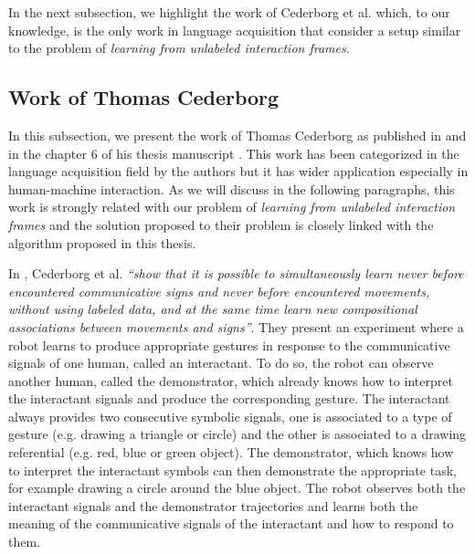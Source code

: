 In the next subsection, we highlight the work of Cederborg et al. \cite{cederborg2011imitating} which, to our knowledge, is the only work in language acquisition that consider a setup similar to the problem of \emph{learning from unlabeled interaction frames}. 


\subsection{Work of Thomas Cederborg}
\label{chapter:related:language:thomas}

In this subsection, we present the work of Thomas Cederborg as published in \cite{cederborg2011imitating} and in the chapter 6 of his thesis manuscript \cite{cederborg2014thesis}. This work has been categorized in the language acquisition field by the authors but it has wider application especially in human-machine interaction. As we will discuss in the following paragraphs, this work is strongly related with our problem of \emph{learning from unlabeled interaction frames} and the solution proposed to their problem is closely linked with the algorithm proposed in this thesis.

In \cite{cederborg2011imitating}, Cederborg et al. \textit{``show that it is possible to simultaneously learn never before encountered communicative signs and never before encountered movements, without using labeled data, and at the same time learn new compositional associations between movements and signs''}. They present an experiment where a robot learns to produce appropriate gestures in response to the communicative signals of one human, called an interactant. To do so, the robot can observe another human, called the demonstrator, which already knows how to interpret the interactant signals and produce the corresponding gesture. The interactant always provides two consecutive symbolic signals, one is associated to a type of gesture (e.g. drawing a triangle or circle) and the other is associated to a drawing referential (e.g. red, blue or green object). The demonstrator, which knows how to interpret the interactant symbols can then demonstrate the appropriate task, for example drawing a circle around the blue object. The robot observes both the interactant signals and the demonstrator trajectories and learns both the meaning of the communicative signals of the interactant and how to respond to them.

